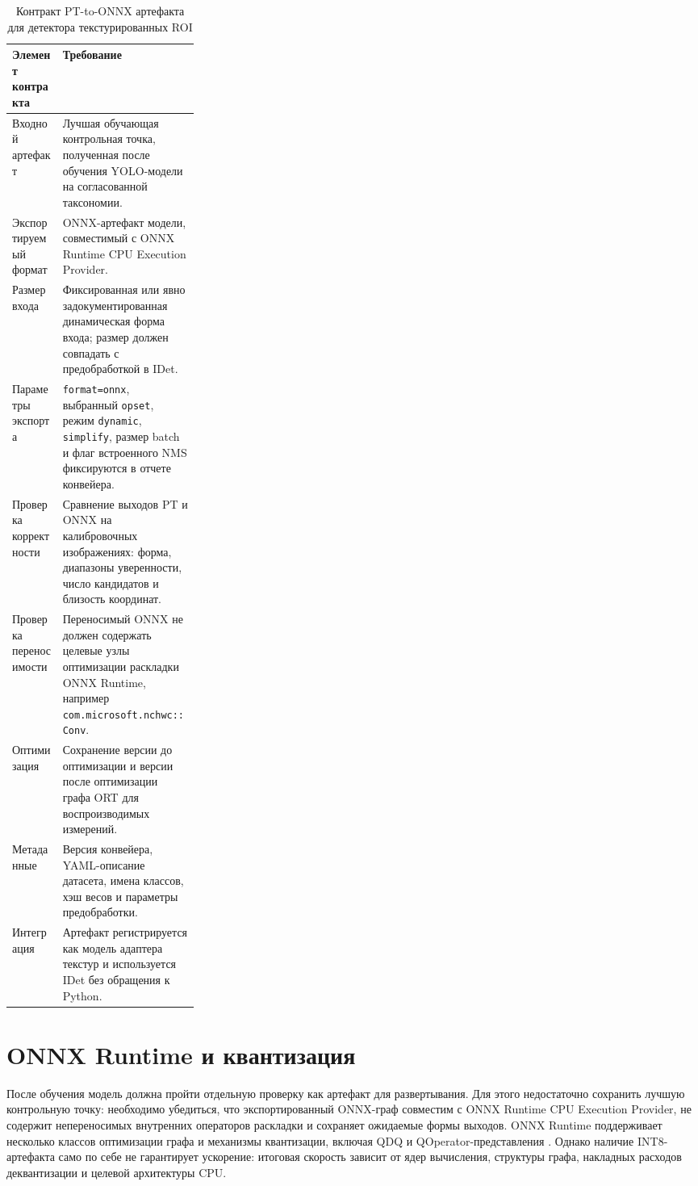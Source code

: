 \documentclass[12pt,a4paper,oneside,openany]{report}
\begin{document}
\begin{table}[H]\centering\caption{Контракт PT-to-ONNX артефакта для детектора текстурированных ROI}\label{tab:pt_to_onnx_contract}\small\begin{tabularx}{\linewidth}{@{}P{0.27\linewidth}Y@{}}\toprule
Элемент контракта & Требование \\
\midrule
Входной артефакт & Лучшая обучающая контрольная точка, полученная после обучения YOLO-модели на согласованной таксономии. \\
Экспортируемый формат & ONNX-артефакт модели, совместимый с ONNX Runtime CPU Execution Provider. \\
Размер входа & Фиксированная или явно задокументированная динамическая форма входа; размер должен совпадать с предобработкой в IDet. \\
Параметры экспорта & \texttt{format=onnx}, выбранный \texttt{opset}, режим \texttt{dynamic}, \texttt{simplify}, размер batch и флаг встроенного NMS фиксируются в отчете конвейера. \\
Проверка корректности & Сравнение выходов PT и ONNX на калибровочных изображениях: форма, диапазоны уверенности, число кандидатов и близость координат. \\
Проверка переносимости & Переносимый ONNX не должен содержать целевые узлы оптимизации раскладки ONNX Runtime, например \texttt{com.microsoft.nchwc::Conv}. \\
Оптимизация & Сохранение версии до оптимизации и версии после оптимизации графа ORT для воспроизводимых измерений. \\
Метаданные & Версия конвейера, YAML-описание датасета, имена классов, хэш весов и параметры предобработки. \\
Интеграция & Артефакт регистрируется как модель адаптера текстур и используется IDet без обращения к Python. \\
\bottomrule\end{tabularx}
\end{table}

\section{ONNX Runtime и квантизация}

После обучения модель должна пройти отдельную проверку как артефакт для развертывания. Для этого недостаточно сохранить лучшую контрольную точку: необходимо убедиться, что экспортированный ONNX-граф совместим с ONNX Runtime CPU Execution Provider, не содержит непереносимых внутренних операторов раскладки и сохраняет ожидаемые формы выходов. ONNX Runtime поддерживает несколько классов оптимизации графа и механизмы квантизации, включая QDQ и QOperator-представления \cite{ort_graph_optim,ort_quantization}. Однако наличие INT8-артефакта само по себе не гарантирует ускорение: итоговая скорость зависит от ядер вычисления, структуры графа, накладных расходов деквантизации и целевой архитектуры CPU.
\end{document}
